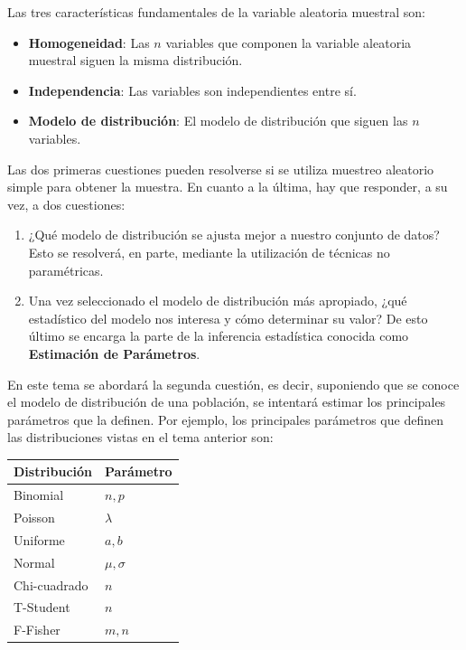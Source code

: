 \documentclass[
  a4paper,
]{scrreport}
\providecommand{\tightlist}{%
  \setlength{\itemsep}{0pt}\setlength{\parskip}{0pt}}\usepackage{longtable,booktabs,array}
\theoremstyle{plain}
\theoremstyle{definition}
\theoremstyle{definition}
\theoremstyle{remark}
\begin{document}
Las tres características fundamentales de la variable aleatoria muestral
son:

\begin{itemize}
\item
  \textbf{Homogeneidad}: Las \(n\) variables que componen la variable
  aleatoria muestral siguen la misma distribución.
\item
  \textbf{Independencia}: Las variables son independientes entre sí.
\item
  \textbf{Modelo de distribución}: El modelo de distribución que siguen
  las \(n\) variables.
\end{itemize}

Las dos primeras cuestiones pueden resolverse si se utiliza muestreo
aleatorio simple para obtener la muestra. En cuanto a la última, hay que
responder, a su vez, a dos cuestiones:

\begin{enumerate}
\def\labelenumi{\arabic{enumi}.}
\tightlist
\item
  ¿Qué modelo de distribución se ajusta mejor a nuestro conjunto de
  datos? Esto se resolverá, en parte, mediante la utilización de
  técnicas no paramétricas.
\item
  Una vez seleccionado el modelo de distribución más apropiado, ¿qué
  estadístico del modelo nos interesa y cómo determinar su valor? De
  esto último se encarga la parte de la inferencia estadística conocida
  como \textbf{Estimación de Parámetros}.
\end{enumerate}

En este tema se abordará la segunda cuestión, es decir, suponiendo que
se conoce el modelo de distribución de una población, se intentará
estimar los principales parámetros que la definen. Por ejemplo, los
principales parámetros que definen las distribuciones vistas en el tema
anterior son:

\begin{longtable}[]{@{}ll@{}}
\toprule\noalign{}
Distribución & Parámetro \\
\midrule\noalign{}
\endhead
\bottomrule\noalign{}
\endlastfoot
Binomial & \(n,p\) \\
Poisson & \(\lambda\) \\
Uniforme & \(a,b\) \\
Normal & \(\mu,\sigma\) \\
Chi-cuadrado & \(n\) \\
T-Student & \(n\) \\
F-Fisher & \(m,n\) \\
\end{longtable}
\end{document}
